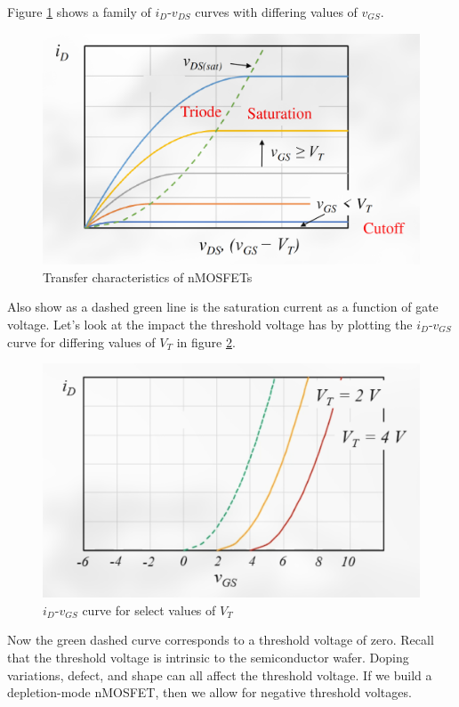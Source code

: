 \documentclass[nobib]{tufte-handout}
\begin{document}
Figure \ref{fig:Transfer Characteristics} shows a family of $i_D$-$v_{DS}$
curves with differing values of $v_{GS}$. 
\begin{figure}
    \caption{Transfer characteristics of nMOSFETs}
    \label{fig:Transfer Characteristics}
    \includegraphics{Transfer Characteristics.png}
\end{figure}
Also show as a dashed green line is the saturation current 
as a function of gate voltage. Let's look at the impact 
the threshold voltage has by plotting the $i_D$-$v_{GS}$ curve 
for differing values of $V_T$ in figure \ref{fig:idvgsvt}. 
\begin{figure}
    \caption{$i_D$-$v_{GS}$ curve for select values of $V_T$}
    \label{fig:idvgsvt}
    \includegraphics{idvgsvt.png}
\end{figure}
Now the green dashed curve corresponds to a threshold voltage of zero. 
Recall that the threshold voltage is intrinsic to 
the semiconductor wafer. Doping variations, defect, and shape can 
all affect the threshold voltage. If we build a depletion-mode nMOSFET,
then we allow for negative threshold voltages.
\end{document}
